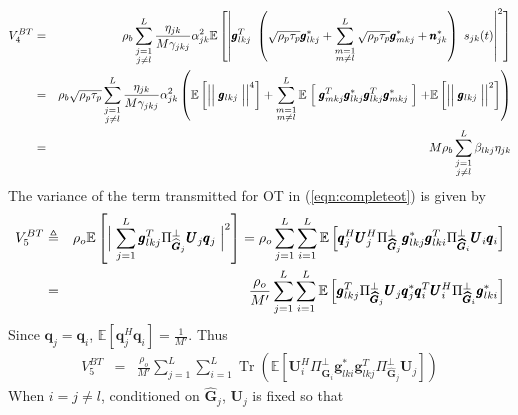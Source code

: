 \documentclass[10pt, a4paper, twoside,fleqn]{article}
\DeclareMathOperator{\Tr}{Tr}
\begin{document}
\begin{eqnarray}
V_4^{BT} &=& \rho_b\sum_{\substack{j=1 \\ j \neq l}}^{L}\frac{\eta_{jk}}{M\gamma_{jkj}}\alpha_{jk}^2\mathbb{E}\left[\left\vert \pmb{g}_{lkj}^T \ \left(\sqrt{\rho_p\tau_p}\pmb{g}^*_{lkj}
                          			 +\sum_{\substack{m=1 \\ m \neq l}}^{L} \sqrt{\rho_p\tau_p}\pmb{g}^*_{mkj}
             			   			 +\pmb{n}^*_{jk}\right) 
             			   	\ s_{jk} (t)\right\vert^2\right] \nonumber \\
         &=& \rho_b\sqrt{\rho_p\tau_p}\sum_{\substack{j=1 \\ j \neq l}}^{L}\frac{\eta_{jk}}{M\gamma_{jkj}}\alpha_{jk}^2\left(\mathbb{E}\left[\Bigm|\Bigm|\pmb{g}_{lkj}\Bigm|\Bigm|^4\right] + \sum\limits_{\substack{m=1 \\ m\neq l}}^{L}\mathbb{E}\Bigm[\pmb{g}^T_{mkj}\pmb{g}^*_{lkj}\pmb{g}^T_{lkj}\pmb{g}^*_{mkj}\Bigm]+\mathbb{E}\left[\Bigm|\Bigm|\pmb{g}_{lkj}\Bigm|\Bigm|^2\right]\right) \nonumber \\
    &=& M\rho_b\sum\limits_{\substack{j=1 \\ j \neq l}}^{L}\beta_{lkj}\eta_{jk}
\end{eqnarray}
The variance of the term transmitted for OT in (\ref{eqn:completeot}) is given by
\begin{eqnarray}
	V_5^{BT} &\triangleq& \rho_o\mathbb{E}\left[\Bigm|\sum_{j=1}^{L}\pmb{g}_{lkj}^T\Pi^{\perp}_{{\widehat{\pmb{G}}_j}}\pmb{U}_j \pmb{q}_{j}\Bigm|^2\right] 
	        = \rho_o\sum\limits_{j=1}^{L}\sum\limits_{i=1}^{L}\mathbb{E}\left[\pmb{q}_j^H\pmb{U}_j^H \Pi^{\perp}_{\pmb{\widehat{G}}_j} \pmb{g}_{lkj}^* \pmb{g}_{lki}^{T}\Pi^{\perp}_{\pmb{\widehat{G}}_i} \pmb{U}_i\pmb{q}_i\right] \nonumber \\
            &=&\frac{\rho_o}{M'}\sum_{j=1}^{L}\sum_{i=1}^{L} \mathbb{E}\left[\pmb{g}_{lkj}^{T}\Pi^{\perp}_{\pmb{\widehat{G}}_j}\pmb{U}_j\pmb{q}_j^*\pmb{q}^T_i\pmb{U}_i^H\Pi^{\perp}_{\pmb{\widehat{G}}_i}\pmb{g}_{lki}^* \right] \nonumber
\end{eqnarray}
Since $\pmb{q}_j=\pmb{q}_i$, $\mathbb{E}[\pmb{q}_j^H\pmb{q}_i]=\frac{1}{M'}$. Thus
\begin{eqnarray}\label{eqn:noiseF4_1}	    
           V_5^{BT} &=&       \frac{\rho_o}{M'}\sum_{j=1}^{L}\sum_{i=1}^{L} \Tr\left(\mathbb{E}\left[\pmb{U}_i^H \Pi^{\perp}_{\pmb{\widehat{G}}_i} \pmb{g}_{lki}^* \pmb{g}_{lkj}^{T}\Pi^{\perp}_{\pmb{\widehat{G}}_j} \pmb{U}_j\right]\right)
\end{eqnarray}
When $i=j\neq l$, conditioned on $\pmb{\widehat{G}}_j$, $\pmb{U}_j$ is fixed so that
\end{document}
